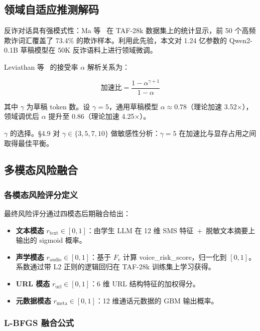 \documentclass[UTF8,a4paper,10pt,twocolumn]{ctexart}
\theoremstyle{plain}
\begin{document}
\subsection{领域自适应推测解码}

反诈对话具有强模式性：Ma 等~\cite{ma2025teleantifraud} 在 TAF-28k 数据集上的统计显示，前 50 个高频欺诈词汇覆盖了 73.4\% 的欺诈样本。利用此先验，本文对 1.24 亿参数的 Qwen2-0.1B 草稿模型在 50K 反诈语料上进行领域微调。

Leviathan 等~\cite{leviathan2023fast} 的接受率 $\alpha$ 解析关系为：

\begin{equation*}
\text{加速比} = \frac{1 - \alpha^{\gamma+1}}{1 - \alpha}
\end{equation*}

其中 $\gamma$ 为草稿 token 数。设 $\gamma = 5$，通用草稿模型 $\alpha \approx 0.78$（理论加速 3.52$\times$），领域调优后 $\alpha$ 提升至 0.86（理论加速 4.25$\times$）。

$\gamma$ 的选择。\S4.9 对 $\gamma \in \{3, 5, 7, 10\}$ 做敏感性分析：$\gamma = 5$ 在加速比与显存占用之间取得最佳平衡。

\subsection{多模态风险融合}

\subsubsection{各模态风险评分定义}

最终风险评分通过四模态后期融合给出：

\begin{itemize}
\item \textbf{文本模态} $r_{\mathrm{text}} \in [0,1]$：由学生 LLM 在 12 维 SMS 特征~+~脱敏文本摘要上输出的 sigmoid 概率。
\item \textbf{声学模态} $r_{\mathrm{audio}} \in [0,1]$：基于 $F_v$ 计算 voice\_risk\_score，归一化到 $[0,1]$。系数通过带 L2 正则的逻辑回归在 TAF-28k 训练集上学习获得。
\item \textbf{URL 模态} $r_{\mathrm{url}} \in [0,1]$：6 维 URL 结构特征的加权得分。
\item \textbf{元数据模态} $r_{\mathrm{meta}} \in [0,1]$：12 维通话元数据的 GBM 输出概率。
\end{itemize}

\subsubsection{L-BFGS 融合公式}
\end{document}
